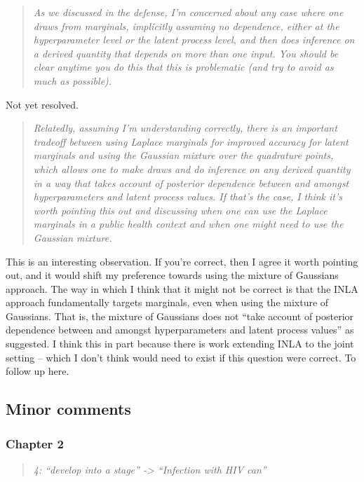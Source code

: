 \documentclass[
  12pt,
]{article}
\begin{document}
\begin{quote}
\emph{As we discussed in the defense, I'm concerned about any case where
one draws from marginals, implicitly assuming no dependence, either at
the hyperparameter level or the latent process level, and then does
inference on a derived quantity that depends on more than one input. You
should be clear anytime you do this that this is problematic (and try to
avoid as much as possible).}
\end{quote}

Not yet resolved.

\begin{quote}
\emph{Relatedly, assuming I'm understanding correctly, there is an
important tradeoff between using Laplace marginals for improved accuracy
for latent marginals and using the Gaussian mixture over the quadrature
points, which allows one to make draws and do inference on any derived
quantity in a way that takes account of posterior dependence between and
amongst hyperparameters and latent process values. If that's the case, I
think it's worth pointing this out and discussing when one can use the
Laplace marginals in a public health context and when one might need to
use the Gaussian mixture.}
\end{quote}

This is an interesting observation. If you're correct, then I agree it
worth pointing out, and it would shift my preference towards using the
mixture of Gaussians approach. The way in which I think that it might
not be correct is that the INLA approach fundamentally targets
marginals, even when using the mixture of Gaussians. That is, the
mixture of Gaussians does not ``take account of posterior dependence
between and amongst hyperparameters and latent process values'' as
suggested. I think this in part because there is work extending INLA to
the joint setting -- which I don't think would need to exist if this
question were correct. To follow up here.

\subsection{Minor comments}\label{minor-comments}

\subsubsection{Chapter 2}\label{chapter-2}

\begin{quote}
\emph{4: ``develop into a stage'' -\textgreater{} ``Infection with HIV
can''}
\end{quote}
\end{document}
